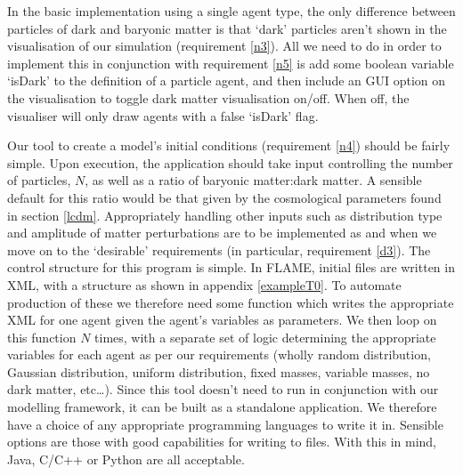 \documentclass[11pt,a4paper]{article}
\begin{document}
In the basic implementation using a single agent type, the only difference between particles of dark and baryonic matter is that `dark' particles aren't shown in the visualisation of our simulation (requirement \ref{n3}). All we need to do in order to implement this in conjunction with requirement \ref{n5} is add some boolean variable `isDark' to the definition of a particle agent, and then include an GUI option on the visualisation to toggle dark matter visualisation on/off. When off, the visualiser will only draw agents with a false `isDark' flag.

Our tool to create a model's initial conditions (requirement \ref{n4}) should be fairly simple. Upon execution, the application should take input controlling the number of particles, $N$, as well as a ratio of baryonic matter:dark matter. A sensible default for this ratio would be that given by the cosmological parameters found in section \ref{lcdm}. Appropriately handling other inputs such as distribution type and amplitude of matter perturbations are to be implemented as and when we move on to the `desirable' requirements (in particular, requirement \ref{d3}).
The control structure for this program is simple. In FLAME, initial files are written in XML, with a structure as shown in appendix \ref{exampleT0}. To automate production of these we therefore need some function which writes the appropriate XML for one agent given the agent's variables as parameters. We then loop on this function $N$ times, with a separate set of logic determining the appropriate variables for each agent as per our requirements (wholly random distribution, Gaussian distribution, uniform distribution, fixed masses, variable masses, no dark matter, etc\ldots). Since this tool doesn't need to run in conjunction with our modelling framework, it can be built as a standalone application. We therefore have a choice of any appropriate programming languages to write it in. Sensible options are those with good capabilities for writing to files. With this in mind, Java, C/C++ or Python are all acceptable.
\end{document}
